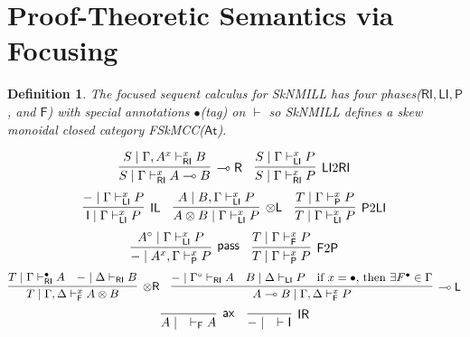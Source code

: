 \documentclass[submission,copyright,creativecommons]{eptcs}
\newtheorem{defn}[theorem]{Definition}
\newcommand{\tl}{\otimes \mathsf{L}}
\newcommand{\tr}{\otimes \mathsf{R}}
\newcommand{\lright}{\multimap \mathsf{R}}
\newcommand{\lleft}{\multimap \mathsf{L}}
\newcommand{\pass}{\mathsf{pass}}
\newcommand{\unitl}{\mathsf{IL}}
\newcommand{\unitr}{\mathsf{IR}}
\newcommand{\ax}{\mathsf{ax}}
\newcommand{\ot}{\otimes}
\newcommand{\lolli}{\multimap}
\newcommand{\I}{\mathsf{I}}
\newcommand{\RI}{\mathsf{RI}}
\newcommand{\LI}{\mathsf{LI}}
\newcommand{\Pass}{\mathsf{P}}
\newcommand{\F}{\mathsf{F}}
\newcommand{\xvdash}{\vdash^{x}}
\begin{document}
\section{Proof-Theoretic Semantics via Focusing}
\begin{defn}
  The \emph{focused sequent calculus} for SkNMILL has four phases($\RI , \LI , \Pass$, and $\F$) with  special annotations $\bullet$(tag) on $\vdash$ so SkNMILL defines a skew monoidal closed category FSkMCC($\mathsf{At}$).

  \begin{displaymath}
    \infer[\lright]{S \mid \Gamma \vdash^{x}_{\RI} A \lolli B}{S \mid \Gamma , A^{x} \vdash^{x}_{\RI} B}
    \quad
    \infer[\LI 2 \RI]{S \mid \Gamma \vdash^{x}_{\RI} P}{S \mid \Gamma \vdash^{x}_{\LI} P}
  \end{displaymath}
  \begin{displaymath}
    \infer[\unitl]{\I \mid \Gamma \xvdash_{\LI} P}{- \mid \Gamma \xvdash_{\LI} P}
    \quad
    \infer[\tl]{A \ot B \mid \Gamma \xvdash_{\LI} P}{A \mid B , \Gamma \xvdash_{\LI} P}
    \quad
    \infer[\Pass 2 \LI]{T \mid \Gamma \xvdash_{\LI} P}{T \mid \Gamma \xvdash_{\Pass} P}
  \end{displaymath}
  \begin{displaymath}
    \infer[\pass]{- \mid A^{x} , \Gamma \xvdash_{\Pass} P }{A^{\circ} \mid \Gamma \xvdash_{\LI} P}
    \quad
    \infer[\F 2 \Pass]{T \mid \Gamma \xvdash_{\Pass} P}{T \mid \Gamma \xvdash_{\F} P}
  \end{displaymath}
  \begin{displaymath}
    \infer[\tr]{T \mid \Gamma , \Delta \xvdash_{\F} A \ot B}{
      T \mid \Gamma \vdash^{\bullet}_{\RI} A
      &
      - \mid \Delta \vdash_{\RI} B
    }
    \quad
    \infer[\lleft]{A \lolli B \mid \Gamma , \Delta \xvdash_{\F} P}{
      - \mid \Gamma^{\circ} \vdash_{\RI} A
      &
      B \mid \Delta \vdash_{\LI} P
      &
      \text{if } x = \bullet \text{, then } \exists F^{\bullet} \in \Gamma
    }
  \end{displaymath}
  \begin{displaymath}
    \infer[\ax]{A \mid \quad \vdash_{\F} A}{}
    \quad
    \infer[\unitr]{- \mid \quad \vdash \I}{}
  \end{displaymath}
\end{defn}
\end{document}
